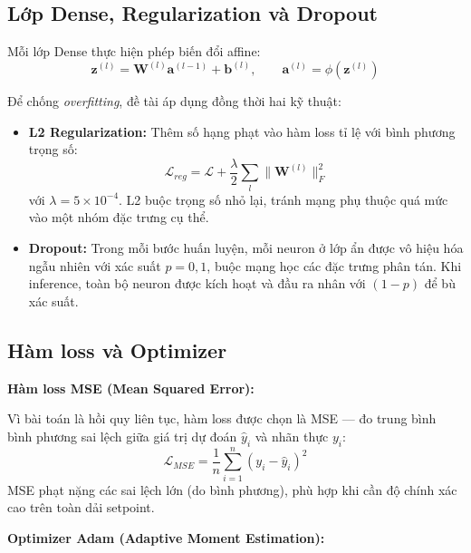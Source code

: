 \subsection{Lớp Dense, Regularization và Dropout}

Mỗi lớp Dense thực hiện phép biến đổi affine:
\begin{equation}
    \mathbf{z}^{(l)} = \mathbf{W}^{(l)}\mathbf{a}^{(l-1)} + \mathbf{b}^{(l)},
    \qquad \mathbf{a}^{(l)} = \phi\!\left(\mathbf{z}^{(l)}\right)
    \label{eq:dense}
\end{equation}


Để chống \textit{overfitting}, đề tài áp dụng đồng thời hai kỹ thuật:

\begin{itemize}
    \item \textbf{L2 Regularization:} Thêm số hạng phạt vào hàm loss tỉ lệ
    với bình phương trọng số:
    \begin{equation}
        \mathcal{L}_{reg} = \mathcal{L}
        + \frac{\lambda}{2}\sum_{l}\|\mathbf{W}^{(l)}\|_F^2
        \label{eq:l2}
    \end{equation}
    với $\lambda = 5\times10^{-4}$. L2 buộc trọng số nhỏ lại, tránh mạng phụ
    thuộc quá mức vào một nhóm đặc trưng cụ thể.

    \item \textbf{Dropout:} Trong mỗi bước huấn luyện, mỗi neuron ở lớp ẩn
    được vô hiệu hóa ngẫu nhiên với xác suất $p = 0{,}1$, buộc mạng học các
    đặc trưng phân tán. Khi inference, toàn bộ neuron được kích hoạt và đầu ra
    nhân với $(1-p)$ để bù xác suất.
\end{itemize}


\subsection{Hàm loss và Optimizer}

\textbf{Hàm loss MSE (Mean Squared Error):}

Vì bài toán là hồi quy liên tục, hàm loss được chọn là MSE --- đo trung bình
bình phương sai lệch giữa giá trị dự đoán $\hat{y}_i$ và nhãn thực $y_i$:
\begin{equation}
    \mathcal{L}_{MSE} = \frac{1}{n}\sum_{i=1}^{n}\left(y_i - \hat{y}_i\right)^2
    \label{eq:mse}
\end{equation}
MSE phạt nặng các sai lệch lớn (do bình phương), phù hợp khi cần độ chính xác
cao trên toàn dải setpoint.

\vspace{6pt}
\textbf{Optimizer Adam (Adaptive Moment Estimation):}

